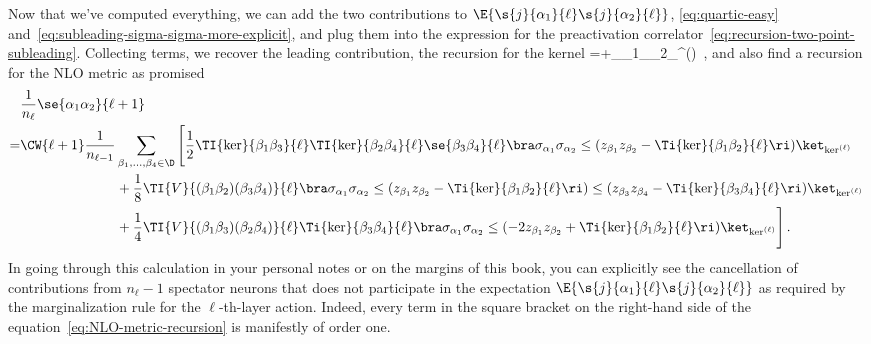 Now that we've computed everything, we can add the two contributions to $\E{\s{j}{\alpha_1}{\ell}\s{j}{\alpha_2}{\ell}}$, \eqref{eq:quartic-easy} and~\eqref{eq:subleading-sigma-sigma-more-explicit}, and plug them into the expression for the preactivation correlator~\eqref{eq:recursion-two-point-subleading}. Collecting terms, we recover the leading contribution, the recursion for the kernel
\be\label{eq:K-recursion}
=+\bra \sigma_{\alpha_1}\sigma_{\alpha_2}\ket_{\ker^{(\ell)}}\, ,
\ee
and also find a recursion for the NLO metric as promised
\begin{align}\label{eq:NLO-metric-recursion}
&\frac{1}{n_{\ell}}\se{\alpha_1\alpha_2}{\ell+1}\, \\
=&\CW{\ell+1}\frac{1}{n_{\ell-1}}\sum_{\beta_1,\ldots,\beta_4\in\D}\Bigg[\frac{1}{2}\TI{\ker}{\beta_1\beta_3}{\ell}\TI{\ker}{\beta_2\beta_4}{\ell}\se{\beta_3\beta_4}{\ell}\bra \sigma_{\alpha_1}\sigma_{\alpha_2} \le(z_{\beta_1}z_{\beta_2}-\Ti{\ker}{\beta_1\beta_2}{\ell}\ri)\ket_{\ker^{(\ell)}}\, \nonumber\\
&\quad \quad \quad \quad \quad \quad \quad +\frac{1}{8} \TI{V}{(\beta_1\beta_2)(\beta_3\beta_4)}{\ell}\bra \sigma_{\alpha_1}\sigma_{\alpha_2} \le(z_{\beta_1}z_{\beta_2}-\Ti{\ker}{\beta_1\beta_2}{\ell}\ri) \le(z_{\beta_3}z_{\beta_4}-\Ti{\ker}{\beta_3\beta_4}{\ell}\ri)\ket_{\ker^{(\ell)}}\, \nonumber\\
&\quad \quad \quad \quad \quad \quad \quad +\frac{1}{4}\TI{V}{(\beta_1\beta_3)(\beta_2\beta_4)}{\ell}\Ti{\ker}{\beta_3\beta_4}{\ell}\bra \sigma_{\alpha_1}\sigma_{\alpha_2} \le(-2z_{\beta_1}z_{\beta_2}+\Ti{\ker}{\beta_1\beta_2}{\ell}\ri) \ket_{\ker^{(\ell)}}\Bigg]\, . \nonumber
\end{align}
In going through this calculation in your personal notes or on the margins of this book, you can explicitly see the cancellation of contributions from $n_{\ell}-1$ spectator neurons that does not participate in the expectation $\E{\s{j}{\alpha_1}{\ell}\s{j}{\alpha_2}{\ell}}$ 
as required by the marginalization rule for the $\ell$-th-layer action. Indeed, every term in the square bracket on the right-hand side of the equation~\eqref{eq:NLO-metric-recursion} is manifestly of order one.



